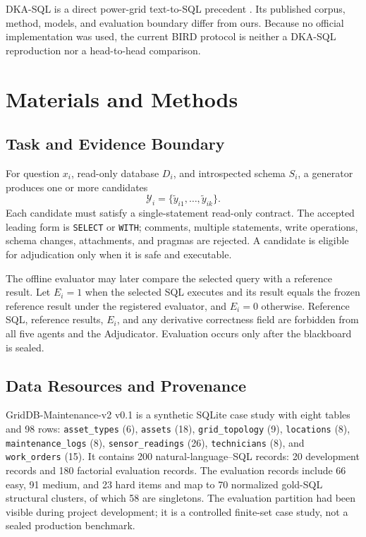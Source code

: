 \documentclass[applsci,article,submit,moreauthors]{Definitions/mdpi}
\begin{document}
DKA-SQL is a direct power-grid text-to-SQL precedent \cite{bian2025dkasql}. Its published corpus, method, models, and evaluation boundary differ from ours. Because no official implementation was used, the current BIRD protocol is neither a DKA-SQL reproduction nor a head-to-head comparison.

\section{Materials and Methods}

\subsection{Task and Evidence Boundary}

For question $x_i$, read-only database $D_i$, and introspected schema $S_i$, a generator produces one or more candidates
\begin{equation}
\mathcal{Y}_i=\{\widetilde{y}_{i1},\ldots,\widetilde{y}_{ik}\}.
\end{equation}
Each candidate must satisfy a single-statement read-only contract. The accepted leading form is \texttt{SELECT} or \texttt{WITH}; comments, multiple statements, write operations, schema changes, attachments, and pragmas are rejected. A candidate is eligible for adjudication only when it is safe and executable.

The offline evaluator may later compare the selected query with a reference result. Let $E_i=1$ when the selected SQL executes and its result equals the frozen reference result under the registered evaluator, and $E_i=0$ otherwise. Reference SQL, reference results, $E_i$, and any derivative correctness field are forbidden from all five agents and the Adjudicator. Evaluation occurs only after the blackboard is sealed.

\subsection{Data Resources and Provenance}

GridDB-Maintenance-v2 v0.1 is a synthetic SQLite case study with eight tables and 98 rows: \texttt{asset\_types} (6), \texttt{assets} (18), \texttt{grid\_topology} (9), \texttt{locations} (8), \texttt{maintenance\_logs} (8), \texttt{sensor\_readings} (26), \texttt{technicians} (8), and \texttt{work\_orders} (15). It contains 200 natural-language--SQL records: 20 development records and 180 factorial evaluation records. The evaluation records include 66 easy, 91 medium, and 23 hard items and map to 70 normalized gold-SQL structural clusters, of which 58 are singletons. The evaluation partition had been visible during project development; it is a controlled finite-set case study, not a sealed production benchmark.
\end{document}
